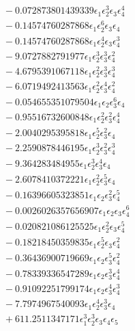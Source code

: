 \documentclass[10pt]{article}
\begin{document}
\begin{align*}
&{}  - 0.072873801439339 \epsilon_{1} \epsilon_{2}^{3} \epsilon_{3} \epsilon_{4}^{4} \\
&{}  - 0.14574760287868 \epsilon_{1} \epsilon_{2}^{6} \epsilon_{3} \epsilon_{4} \\
&{}  - 0.14574760287868 \epsilon_{1} \epsilon_{2}^{4} \epsilon_{3} \epsilon_{4}^{3} \\
&{}  - 9.0727882791977 \epsilon_{1} \epsilon_{2}^{3} \epsilon_{3}^{3} \epsilon_{4}^{2} \\
&{}  - 4.6795391067118 \epsilon_{1} \epsilon_{2}^{2} \epsilon_{3}^{3} \epsilon_{4}^{3} \\
&{}  - 6.0719492413563 \epsilon_{1} \epsilon_{2}^{2} \epsilon_{3}^{4} \epsilon_{4}^{2} \\
&{}  - 0.054655351079504 \epsilon_{1} \epsilon_{2} \epsilon_{3}^{6} \epsilon_{4} \\
&{}  - 0.95516732600848 \epsilon_{1} \epsilon_{2}^{2} \epsilon_{3}^{2} \epsilon_{4}^{4} \\
&{}  - 2.0040295395818 \epsilon_{1} \epsilon_{2}^{5} \epsilon_{3}^{2} \epsilon_{4} \\
&{}  - 2.2590878446195 \epsilon_{1} \epsilon_{2}^{3} \epsilon_{3}^{2} \epsilon_{4}^{3} \\
&{}  - 9.364283484955 \epsilon_{1} \epsilon_{2}^{3} \epsilon_{3}^{4} \epsilon_{4} \\
&{}  - 2.6078410372221 \epsilon_{1} \epsilon_{2}^{2} \epsilon_{3}^{5} \epsilon_{4} \\
&{}  - 0.16396605323851 \epsilon_{1} \epsilon_{2} \epsilon_{3}^{2} \epsilon_{4}^{5} \\
&{}  - 0.0026026357656907 \epsilon_{1} \epsilon_{2} \epsilon_{3} \epsilon_{4}^{6} \\
&{}  - 0.020821086125525 \epsilon_{1} \epsilon_{2}^{2} \epsilon_{3} \epsilon_{4}^{5} \\
&{}  - 0.18218450359835 \epsilon_{1} \epsilon_{2}^{5} \epsilon_{3} \epsilon_{4}^{2} \\
&{}  - 0.36436900719669 \epsilon_{1} \epsilon_{2} \epsilon_{3}^{5} \epsilon_{4}^{2} \\
&{}  - 0.78339336547289 \epsilon_{1} \epsilon_{2} \epsilon_{3}^{3} \epsilon_{4}^{4} \\
&{}  - 0.91092251799174 \epsilon_{1} \epsilon_{2} \epsilon_{3}^{4} \epsilon_{4}^{3} \\
&{}  - 7.7974967540093 \epsilon_{1} \epsilon_{2}^{4} \epsilon_{3}^{3} \epsilon_{4} \\
&{}  + 611.2511347171 \epsilon_{1}^{3} \epsilon_{2}^{3} \epsilon_{3} \epsilon_{4} \epsilon_{5} \\

\end{align*}
\end{document}
